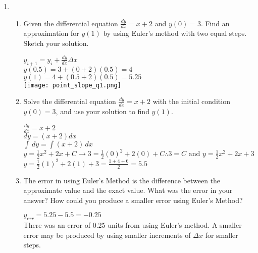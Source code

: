 \documentclass[10pt,letterpaper]{report}
\begin{document}
\begin{enumerate}
  \item{}
    \begin{enumerate}
      \item{Given the differential equation $\frac{dy}{dx}=x+2$ and $y(0)=3$. Find an approximation for $y(1)$ by using Euler's method with two equal steps. Sketch your solution. \\}
        \begin{multicols}{2}
          $y_{i+1}=y_{i}+\frac{dy}{dx}\Delta x$ \\
        
          $y(0.5)=3+(0+2)(0.5)=4$ \\
          
          $y(1)=4+(0.5+2)(0.5)=5.25$ \\
          
          \texttt{[image: point\_slope\_q1.png]}
        \end{multicols}
        
      \item{Solve the differential equation $\frac{dy}{dx}=x+2$ with the initial condition $y(0)=3$, and use your solution to find $y(1)$. \\}
      
        $\frac{dy}{dx}=x+2$ \\
        
        $dy=(x+2)dx$ \\
        
        $\int{}\,dy=\int{(x+2)}\,dx$ \\
        
        $y=\frac{1}{2}x^{2}+2x+C\rightarrow 3=\frac{1}{2}(0)^{2}+2(0)+C\therefore 3=C \text{ and } y=\frac{1}{2}x^{2}+2x+3$ \\
        
        $y=\frac{1}{2}(1)^{2}+2(1)+3=\frac{1+4+6}{2}=5.5$ \\
        
      \item{The error in using Euler's Method is the difference between the approximate value and the exact value. What was the error in your answer? How could you produce a smaller error using Euler's Method? \\}
      
        $y_{err}=5.25-5.5=-0.25$ \\
        
        There was an error of 0.25 units from using Euler's method. A smaller error may be produced by using smaller increments of $\Delta x$ for smaller steps. \\
        

\end{enumerate}
\end{enumerate}
\end{document}
